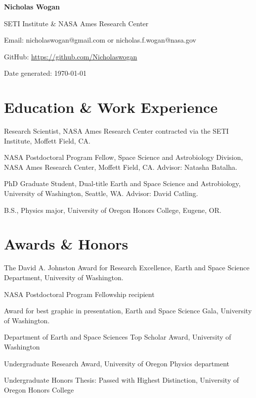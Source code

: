 \documentclass[12pt]{article}
\begin{document}
\begin{center}
\textbf{Nicholas Wogan}

SETI Institute \& NASA Ames Research Center

Email: nicholaswogan@gmail.com or nicholas.f.wogan@nasa.gov

GitHub: \url{https://github.com/Nicholaswogan}

Date generated: \today

\end{center}

\section{Education \& Work Experience}

\begin{cvlist}
\item[2025 - pres.]
  Research Scientist, NASA Ames Research Center contracted via the SETI Institute, Moffett Field, CA.
\item[2023 - 2025]
  NASA Postdoctoral Program Fellow, Space Science and Astrobiology Division, NASA Ames Research Center, Moffett Field, CA. Advisor: Natasha Batalha.
\item[2017 - 2023]
  PhD Graduate Student, Dual-title Earth and Space Science and Astrobiology, University of Washington, Seattle, WA. Advisor: David Catling.
\item[2012 - 2016]
  B.S., Physics major, University of Oregon Honors College, Eugene, OR.
\end{cvlist}

\section{Awards \& Honors}

\begin{cvlist}
\item[2023]
  The David A. Johnston Award for Research Excellence, Earth and Space Science Department, University of Washington.
\item[2023] 
  NASA Postdoctoral Program Fellowship recipient
\item[2023]
  Award for best graphic in presentation, Earth and Space Science Gala, University of Washington.
\item[2017]
  Department of Earth and Space Sciences Top Scholar Award, University of Washington
\item[2016]
  Undergraduate Research Award, University of Oregon Physics department
\item[2016]
  Undergraduate Honors Thesis: Passed with Highest Distinction, University of Oregon Honors College
\end{cvlist}
\end{document}

